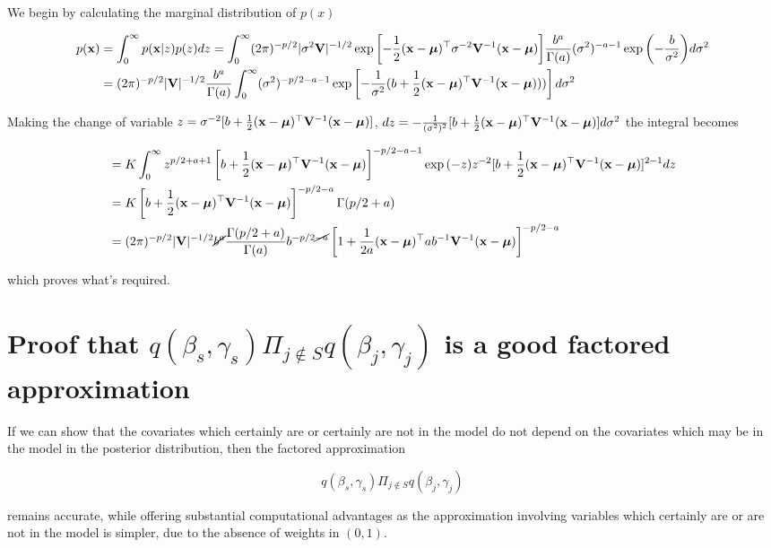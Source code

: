 \documentclass{amsart}[12pt]
\theoremstyle{definition}
\begin{document}
We begin by calculating the marginal distribution of $p(x)$

\begin{align*}
p({\bf x}) &= \int_0^\infty p({\bf x}|z) p(z) dz = \int_0^\infty (2 \pi)^{-p/2} |\sigma^2 {\bf V}|^{-1/2} 
				\exp{\left[-\frac{1}{2}({\bf x}- {\boldsymbol\mu})^\top \sigma^{-2} {\bf V}^{-1} ({\bf x}- {\boldsymbol\mu}) \right]} 
				\frac{b^a}{\Gamma(a)} (\sigma^2)^{-a-1} \exp{\left(-\frac{b}{\sigma^2}\right)} d \sigma^2 \\
		&= (2 \pi)^{-p/2} |{\bf V}|^{-1/2} \frac{b^a}{\Gamma(a)} \int_0^\infty (\sigma^2)^{-p/2-a-1} \exp \left[-\frac{1}{\sigma^2} (b + \frac{1}{2} ({\bf x} - {\boldsymbol \mu})^\top {\bf V}^{-1} ({\bf x} - {\boldsymbol \mu}))) \right] d \sigma^2
\end{align*}

Making the change of variable $z = \sigma^{-2}[b + \frac{1}{2}({\bf x} - {\boldsymbol \mu})^\top {\bf V}^{-1} ({\bf x} - {\boldsymbol \mu})]$,
$dz = - \frac{1}{(\sigma^2)^2} [b + \frac{1}{2} ({\bf x} - {\boldsymbol \mu})^\top {\bf V}^{-1} ({\bf x} - {\boldsymbol \mu})] d \sigma^2$
the integral becomes

\begin{align*}
	&= K \int_0^\infty z^{p/2 + a + 1} \left[b + \frac{1}{2} ({\bf x} - {\boldsymbol \mu})^\top {\bf V}^{-1} ({\bf x} - {\boldsymbol \mu})\right]^{-p/2 -a - 1}
			\exp{(-z)} z^{-2} [b + \frac{1}{2} ({\bf x} - {\boldsymbol \mu})^\top {\bf V}^{-1} ({\bf x} - {\boldsymbol \mu})]^{2-1} dz \\
	&= K \left[b + \frac{1}{2} ({\bf x} - {\boldsymbol \mu})^\top {\bf V}^{-1} ({\bf x} - {\boldsymbol \mu})\right]^{-p/2 - a} \Gamma(p/2 + a) \\
	&= (2 \pi)^{-p/2} |{\bf V}|^{-1/2} \cancel{b^a} \frac{\Gamma(p/2 + a)}{\Gamma(a)} b^{-p/2 \cancel{- a}} \left[ 1 + \frac{1}{2a} ({\bf x} - {\boldsymbol \mu})^\top a b^{-1} {\bf V}^{-1} ({\bf x} - {\boldsymbol \mu}) \right]^{-p/2 - a}
\end{align*}

which proves what's required.

\section{Proof that $q(\beta_s, \gamma_s) \Pi_{j \notin S} q(\beta_j, \gamma_j)$ is a good factored approximation}

If we can show that the covariates which certainly are or certainly are not in the model do not depend on the
covariates which may be in the model in the posterior distribution, then the factored approximation

\[
	q(\beta_s, \gamma_s) \Pi_{j \notin S} q(\beta_j, \gamma_j)
\]

remains accurate, while offering substantial computational advantages as the approximation involving variables
which certainly are or are not in the model is simpler, due to the absence of weights in $(0, 1)$.
\end{document}
